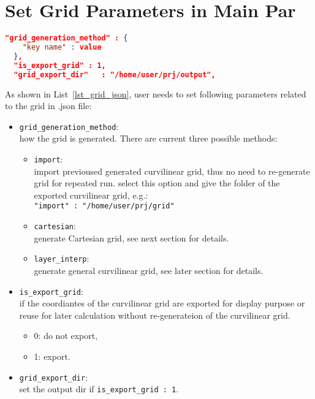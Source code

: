 \section{Set Grid Parameters in Main Par} \label{sec_grid_json} 

\begin{lstlisting}[language=json,
 caption=Grid related parameters in .json,
 label={lst_grid_json},
 frame=tb]
  "grid_generation_method" : {
    "key name" : value
  },
  "is_export_grid" : 1,
  "grid_export_dir"   : "/home/user/prj/output",               
\end{lstlisting}

As shown in List~\ref{lst_grid_json}, user needs to set following parameters
related to the grid in .json file:
\begin{itemize}
  \item \verb|grid_generation_method|: \\
    how the grid is generated.
    There are current three possible methods:

    \begin{itemize}
      \item \verb|import|: \\
        import previoused generated curvilinear grid, 
        thus no need to re-generate grid for repeated run. 
        select this option and give the folder of the exported curvilinear grid, e.g.:  \\
        \verb|"import" : "/home/user/prj/grid"| 

      \item \verb|cartesian|: \\
        generate Cartesian grid, see next section for details.

      \item \verb|layer_interp|: \\
        generate general curvilinear grid, see later section for details.
    \end{itemize}

  \item \verb|is_export_grid|: \\
    if the coordiantes of the curvilinear grid are exported 
         for display purpose or reuse for later calculation without re-generateion of the curvilinear grid.
      \begin{itemize}
        \item 0: do not export,
        \item 1: export.
      \end{itemize}

  \item \verb|grid_export_dir|: \\
    set the output dir if \verb|is_export_grid : 1|.
\end{itemize}

